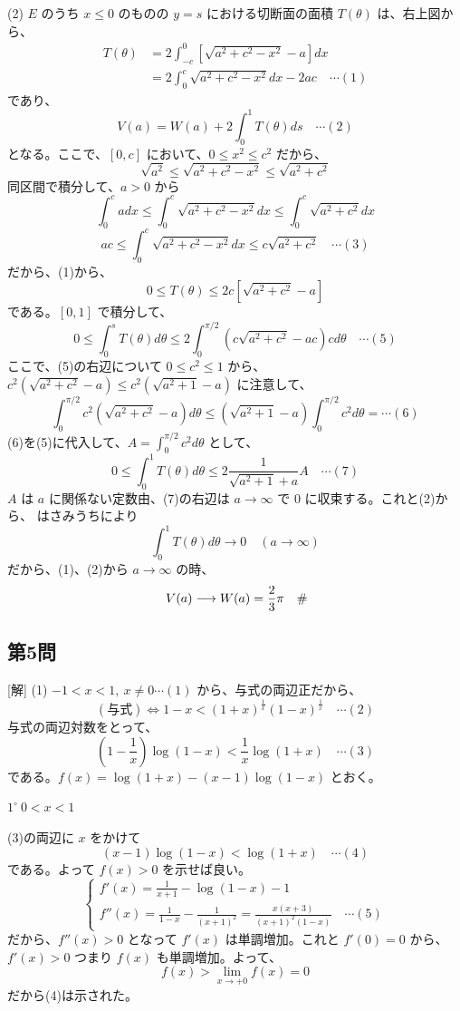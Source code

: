 \documentclass[../main.tex]{subfiles}
\begin{document}
(2) $E$ のうち $x \le 0$ のものの $y=s$ における切断面の面積 $T(\theta)$ は、右上図から、
\begin{align*}
T(\theta) &= 2 \int_{-c}^{0} \left[ \sqrt{a^2+c^2-x^2} - a \right] dx \\
&= 2 \int_{0}^{c} \sqrt{a^2+c^2-x^2} dx - 2ac \quad \cdots (1)
\end{align*}
であり、
\[
V(a) = W(a) + 2 \int_{0}^{1} T(\theta) ds \quad \cdots (2)
\]
となる。ここで、$[0,c]$ において、$0 \le x^2 \le c^2$ だから、
\[
\sqrt{a^2} \le \sqrt{a^2+c^2-x^2} \le \sqrt{a^2+c^2}
\]
同区間で積分して、$a>0$ から
\[
\int_{0}^{c} a dx \le \int_{0}^{c} \sqrt{a^2+c^2-x^2} dx \le \int_{0}^{c} \sqrt{a^2+c^2} dx
\]
\[
ac \le \int_{0}^{c} \sqrt{a^2+c^2-x^2} dx \le c\sqrt{a^2+c^2} \quad \cdots (3)
\]
だから、(1)から、
\[
0 \le T(\theta) \le 2c \left[ \sqrt{a^2+c^2} - a \right]
\]
である。$[0,1]$ で積分して、
\[
0 \le \int_{0}^{s} T(\theta) d\theta \le 2 \int_{0}^{\pi/2} \left( c\sqrt{a^2+c^2} - ac \right) c d\theta \quad \cdots (5)
\]
ここで、(5)の右辺について $0 \le c^2 \le 1$ から、$c^2(\sqrt{a^2+c^2} - a) \le c^2(\sqrt{a^2+1} - a)$ に注意して、
\[
\int_{0}^{\pi/2} c^2(\sqrt{a^2+c^2} - a) d\theta \le (\sqrt{a^2+1} - a) \int_{0}^{\pi/2} c^2 d\theta = \cdots (6)
\]
(6)を(5)に代入して、$A = \int_{0}^{\pi/2} c^2 d\theta$ として、
\[
0 \le \int_{0}^{1} T(\theta) d\theta \le 2 \frac{1}{\sqrt{a^2+1} + a} A \quad \cdots (7)
\]
$A$ は $a$ に関係ない定数由、(7)の右辺は $a \to \infty$ で $0$ に収束する。これと(2)から、
はさみうちにより
\[
\int_{0}^{1} T(\theta) d\theta \to 0 \quad (a \to \infty)
\]
だから、(1)、(2)から $a \to \infty$ の時、
\[
V(a) \longrightarrow W(a) = \frac{2}{3}\pi \quad \text{\#\!}
\]

\subsection*{第5問}
[解] (1) $-1 < x < 1, \ x \ne 0 \cdots (1)$ から、与式の両辺正だから、
\[
(与式) \iff 1 - x < (1+x)^{\frac{1}{x}}(1-x)^{\frac{1}{x}} \quad \cdots (2)
\]
与式の両辺対数をとって、
\[
(1 - \frac{1}{x}) \log(1-x) < \frac{1}{x} \log(1+x) \quad \cdots (3)
\]
である。$f(x) = \log(1+x) - (x-1)\log(1-x)$ とおく。

$1^\circ \ 0 < x < 1$

(3)の両辺に $x$ をかけて
\[
(x-1) \log(1-x) < \log(1+x) \quad \cdots (4)
\]
である。よって $f(x) > 0$ を示せば良い。
\[
\begin{cases}
  f'(x) = \frac{1}{x+1} - \log(1-x) - 1 \\
  f''(x) = \frac{1}{1-x} - \frac{1}{(x+1)^2} = \frac{x(x+3)}{(x+1)^2(1-x)} \quad \cdots (5)
\end{cases}
\]
だから、$f''(x) > 0$ となって $f'(x)$ は単調増加。これと $f'(0) = 0$ から、$f'(x) > 0$ つまり
$f(x)$ も単調増加。よって、
\[
f(x) > \lim_{x \to +0} f(x) = 0
\]
だから(4)は示された。
\end{document}
